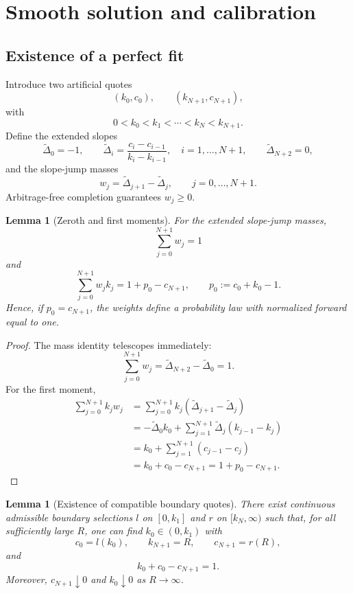 \documentclass[11pt]{article}
\newtheorem{lemma}[theorem]{Lemma}
\begin{document}
\section{Smooth solution and calibration}\label{sec:exactproof}
\subsection{Existence of a perfect fit}
Introduce two artificial quotes
\[
(k_0,c_0),\qquad (k_{N+1},c_{N+1}),
\]
with
\[
0<k_0<k_1<\cdots<k_N<k_{N+1}.
\]
Define the extended slopes
\[
\widetilde\Delta_0=-1,
\qquad
\widetilde\Delta_i=\frac{c_i-c_{i-1}}{k_i-k_{i-1}},\quad i=1,\ldots,N+1,
\qquad
\widetilde\Delta_{N+2}=0,
\]
and the slope-jump masses
\begin{equation}
w_j=\widetilde\Delta_{j+1}-\widetilde\Delta_j,
\qquad j=0,\ldots,N+1.
\label{eq:extendedweights}
\end{equation}
Arbitrage-free completion guarantees $w_j\ge0$.

\begin{lemma}[Zeroth and first moments]\label{lem:moments}
For the extended slope-jump masses,
\begin{equation}
\sum_{j=0}^{N+1}w_j=1
\label{eq:massone}
\end{equation}
and
\begin{equation}
\sum_{j=0}^{N+1}w_jk_j=1+p_0-c_{N+1},
\qquad p_0:=c_0+k_0-1.
\label{eq:firstmoment}
\end{equation}
Hence, if $p_0=c_{N+1}$, the weights define a probability law with normalized forward equal to one.
\end{lemma}

\begin{proof}
The mass identity telescopes immediately:
\[
\sum_{j=0}^{N+1}w_j
=\widetilde\Delta_{N+2}-\widetilde\Delta_0=1.
\]
For the first moment,
\begin{align*}
\sum_{j=0}^{N+1}k_jw_j
&=\sum_{j=0}^{N+1}k_j(\widetilde\Delta_{j+1}-\widetilde\Delta_j)\\
&=-\widetilde\Delta_0k_0
+\sum_{j=1}^{N+1}\widetilde\Delta_j(k_{j-1}-k_j)\\
&=k_0+\sum_{j=1}^{N+1}(c_{j-1}-c_j)\\
&=k_0+c_0-c_{N+1}=1+p_0-c_{N+1}.
\end{align*}
\end{proof}

\begin{lemma}[Existence of compatible boundary quotes]\label{lem:boundary}
There exist continuous admissible boundary selections $l$ on $[0,k_1]$ and $r$ on $[k_N,\infty)$ such that, for all sufficiently large $R$, one can find $k_0\in(0,k_1)$ with
\[
c_0=l(k_0),\qquad k_{N+1}=R,\qquad c_{N+1}=r(R),
\]
and
\begin{equation}
k_0+c_0-c_{N+1}=1.
\label{eq:boundarymoment}
\end{equation}
Moreover, $c_{N+1}\downarrow0$ and $k_0\downarrow0$ as $R\to\infty$.
\end{lemma}
\end{document}
